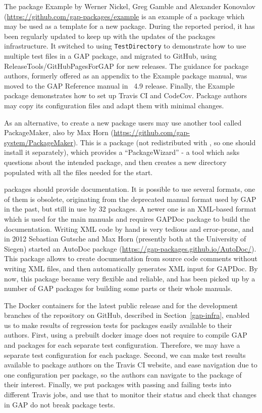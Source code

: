 \documentclass{deliverablereport}
\renewcommand{\comment}[1]{\TODO{Comment: #1}}
\begin{document}
The \GAP package {\sf Example} by Werner Nickel, Greg Gamble and
Alexander Konovalov (\url{https://github.com/gap-packages/example}
is an example of a \GAP package which may be used as a template for 
a new package. During the reported period, it has been regularly updated
to keep up with the updates of the packages infrastructure. It
switched to using {\tt TestDirectory} to demonstrate how to use 
multiple test files in a GAP package, and migrated
to GitHub, using {\sf ReleaseTools/GitHubPagesForGAP}
for new releases. The guidance for package authors, formerly offered
as an appendix to the {\sf Example} package manual, was moved to the GAP
Reference manual in \GAP~4.9 release. Finally, the {\sf Example} package
demonstrates how to set up Travis CI and CodeCov. Package authors
may copy its configuration files and adapt them with minimal changes.

As an alternative, to create a new package
\GAP users may use another tool called {\sf PackageMaker},
also by Max Horn (\url{https://github.com/gap-system/PackageMaker}). This is
a \GAP package (not redistributed with \GAP, so one should install it
separately), which provides a ``PackageWizard'' - a tool which asks questions
about the intended package, and then creates a new directory populated with 
all the files needed for the start.

\GAP packages should provide documentation. It is possible to use several
formats, one of them is obsolete, originating from the deprecated 
manual format used by GAP in the past, but still in use by 32 packages.
A newer one is an XML-based format which is used for the main \GAP manuals
and requires {\sf GAPDoc package} to build the documentation. Writing XML
code by hand is very tedious and error-prone, and in 2012 Sebastian Gutsche 
and Max Horn (presently both at the University of Siegen) started an 
{\sf AutoDoc} package (\url{https://gap-packages.github.io/AutoDoc/}).
This package allows to create documentation from source code comments
without writing XML files, and then automatically generates XML input
for GAPDoc. By now, this package became very flexible and reliable, and
has been picked up by a number \comment{how many} of GAP packages for building 
some parts or their whole manuals.

The Docker containers for the latest \GAP public release and for the
development branches of the \GAP repository on GitHub, described in
Section~\ref{gap-infra}, enabled us to make results of regression
tests for \GAP packages easily available to their authors. First,
using a prebuilt docker image does not require to compile GAP and 
packages for each separate test configuration. Therefore, we may
have a separate test configuration for each package. Second, we 
can make test results available to package authors on the Travis CI
website, and ease navigation due to one configuration per package,
so the authors can navigate to the package of their interest.
Finally, we put packages with passing and failing tests into different
Travis jobs, and use that to monitor their status and check that
changes in GAP do not break package tests. 
\end{document}
